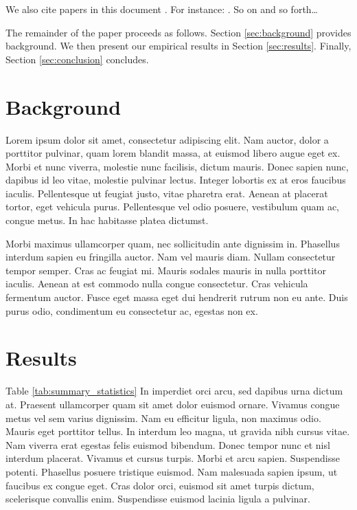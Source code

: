 \documentclass[12pt]{article}
\begin{document}
We also cite papers in this document \citep{Chetty2013}. For instance: \citet{Hansen1992}. So on and so forth\ldots

The remainder of the paper proceeds as follows. Section \ref{sec:background} provides background. We then present our
empirical results in Section \ref{sec:results}. Finally, Section \ref{sec:conclusion} concludes. 

\section{Background 
\label{sec:background}}

Lorem ipsum dolor sit amet, consectetur adipiscing elit. Nam auctor, dolor a porttitor pulvinar, quam lorem blandit massa, at euismod libero augue eget ex. Morbi et nunc viverra, molestie nunc facilisis, dictum mauris. Donec sapien nunc, dapibus id leo vitae, molestie pulvinar lectus. Integer lobortis ex at eros faucibus iaculis. Pellentesque ut feugiat justo, vitae pharetra erat. Aenean at placerat tortor, eget vehicula purus. Pellentesque vel odio posuere, vestibulum quam ac, congue metus. In hac habitasse platea dictumst.


Morbi maximus ullamcorper quam, nec sollicitudin ante dignissim in. Phasellus interdum sapien eu fringilla auctor. Nam vel mauris diam. Nullam consectetur tempor semper. Cras ac feugiat mi. Mauris sodales mauris in nulla porttitor iaculis. Aenean at est commodo nulla congue consectetur. Cras vehicula fermentum auctor. Fusce eget massa eget dui hendrerit rutrum non eu ante. Duis purus odio, condimentum eu consectetur ac, egestas non ex.





\section{Results \label{sec:results}}




Table \ref{tab:summary_statistics} In imperdiet orci arcu, sed dapibus urna dictum at. Praesent ullamcorper quam sit amet dolor euismod ornare. Vivamus congue metus vel sem varius dignissim. Nam eu efficitur ligula, non maximus odio. Mauris eget porttitor tellus. In interdum leo magna, ut gravida nibh cursus vitae. Nam viverra erat egestas felis euismod bibendum. Donec tempor nunc et nisl interdum placerat. Vivamus et cursus turpis. Morbi et arcu sapien. Suspendisse potenti. Phasellus posuere tristique euismod. Nam malesuada sapien ipsum, ut faucibus ex congue eget. Cras dolor orci, euismod sit amet turpis dictum, scelerisque convallis enim. Suspendisse euismod lacinia ligula a pulvinar.
\end{document}

